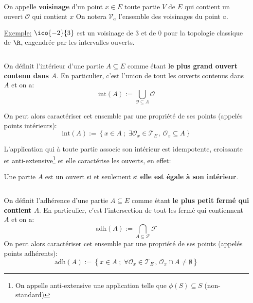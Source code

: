 \subsection*{}
On appelle \textbf{voisinage} d'un point \(x \in E\) toute partie \(V\) de \(E\) qui contient un ouvert \(\mathcal{O}\) qui contient \(x\)
On notera \(\mathscr{V}_a\) l'ensemble des voisinages du point \(a\).\<

\underline{Exemple:} \(\ico{-2}{3}\) est un voisinage de \(3\) et de \(0\) pour la topologie classique de \(\R\), engendrée par les intervalles ouverts.
\subsection*{}
On définit l'intérieur d'une partie \(A \subseteq E\) comme étant \textbf{le plus grand ouvert contenu dans \(A\)}. En particulier, c'est l'union de tout les ouverts contenus dans \(A\) et on a:
\[
   \text{int}(A) := \bigcup_{\mathcal{O} \subseteq{A}}\mathcal{O}
\]

On peut alors caractériser cet ensemble par une propriété de ses points (appelés points intérieurs):
\[ 
   \text{int}(A) := \left\{ x \in A \; ; \; \exists \mathcal{O}_x \in \mathcal{T}_E \, , \, \mathcal{O}_x \subseteq A \right\}  
\]

L'application qui à toute partie associe son intérieur est idempotente, croissante et anti-extensive\footnote[2]{On appelle anti-extensive une application telle que \(\phi(S) \subseteq S\) (non-standard)} et elle caractérise les ouverts, en effet:
\begin{center}
   Une partie \(A\) est un ouvert si et seulement si \textbf{elle est égale à son intérieur}.
\end{center}
\subsection*{}
On définit l'adhérence d'une partie \(A \subseteq E\) comme étant \textbf{le plus petit fermé qui contient \(A\)}. En particulier, c'est l'intersection de tout les fermé qui contiennent \(A\) et on a:
\[
    \text{adh}(A) := \bigcap_{A \subseteq \mathcal{F}}\mathcal{F}
\]
On peut alors caractériser cet ensemble par une propriété de ses points (appelés points adhérents):
\[ 
   \text{adh}(A) := \left\{ x \in A \; ; \; \forall \mathcal{O}_x \in \mathcal{T}_E \, , \, \mathcal{O}_x \cap A \neq \emptyset \right\}  
\]

